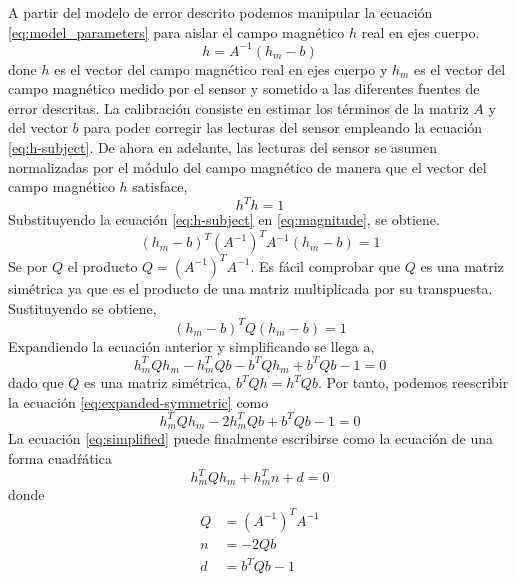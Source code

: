 \documentclass[a4paper,12pt]{book}
\begin{document}
A partir del modelo de error descrito podemos manipular la ecuación \eqref{eq:model_parameters} para aislar el campo magnético $h$ real en ejes cuerpo.
\begin{equation}
    h=A^{-1}(h_m-b) \label{eq:h-subject}
\end{equation}
done $h$ es el vector del campo magnético real en ejes cuerpo y $h_m$ es el vector del campo magnético medido por el sensor y sometido a las diferentes fuentes de error descritas. La calibración consiste en estimar los términos de la matriz $A$ y del vector $b$ para poder corregir las lecturas del sensor empleando la ecuación \eqref{eq:h-subject}. De ahora en adelante, las lecturas del sensor se asumen normalizadas por el módulo del campo magnético de manera que el vector del campo magnético $h$ satisface, 
\begin{equation}
    h^T h = 1 \label{eq:magnitude}
\end{equation}
Substituyendo la ecuación \eqref{eq:h-subject} en \eqref{eq:magnitude}, se obtiene.
\begin{equation}
    (h_m-b)^T (A^{-1})^{T} A^{-1} (h_m-b) = 1 \label{eq:substitute}
\end{equation}
Se por $Q$ el producto $Q = (A^{-1})^T A^{-1}$. Es fácil comprobar que $Q$ es una matriz simétrica ya que es el producto de una matriz multiplicada por su transpuesta. Sustituyendo se obtiene,
\begin{equation}
    (h_m-b)^T Q (h_m-b) = 1 \label{eq:symmetric}
\end{equation}
Expandiendo la ecuación anterior y simplificando se llega a,
\begin{equation}
    h_m^T Q h_m - h_m^T Q b - b^T Q h_m + b^T Q b - 1 = 0 \label{eq:expanded-symmetric}
\end{equation}
dado que $Q$ es una matriz simétrica, $b^T Q h = h^T Q b$. Por tanto, podemos reescribir la ecuación \eqref{eq:expanded-symmetric} como
\begin{equation}
    h_m^T Q h_m - 2h_m^T Q b + b^T Q b - 1 = 0 \label{eq:simplified}
\end{equation}
La ecuación \eqref{eq:simplified} puede finalmente escribirse como la ecuación de una forma cuadŕática
\begin{equation}
    h_m^T Q h_m + h_m^T n + d = 0 \label{eq:quadric}
\end{equation}
donde
\begin{eqnarray}
    Q &= (A^{-1})^T A^{-1} \label{eq:Q-definition}\\
    n &= -2Qb \label{eq:n-definition}\\
    d &= b^T Qb - 1 \label{eq:d-definition}
\end{eqnarray}
\end{document}
